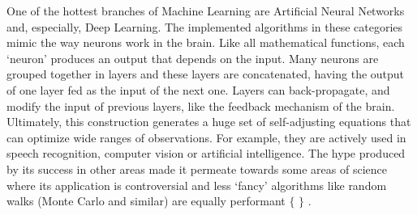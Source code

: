 One of the hottest branches of Machine Learning are Artificial Neural Networks and, especially, Deep Learning. The implemented algorithms in these categories mimic the way neurons work in the brain. Like all mathematical functions, each ‘neuron’ produces an output that depends on the input. Many neurons are grouped together in layers and these layers are concatenated, having the output of one layer fed as the input of the next one. Layers can back-propagate, and modify the input of previous layers, like the feedback mechanism of the brain. Ultimately, this construction generates a huge set of self-adjusting equations that can optimize wide ranges of observations. For example, they are actively used in speech recognition, computer vision or artificial intelligence. The hype produced by its success in other areas made it permeate towards some areas of science where its application is controversial and less ‘fancy’ algorithms like random walks (Monte Carlo and similar) are equally performant $ \{ $ $ \} $ .

